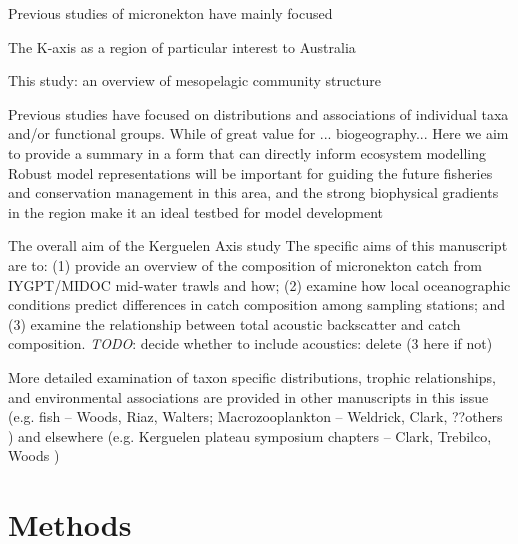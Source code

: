 \documentclass[12pt]{article}
\begin{document}
{Previous studies of micronekton have mainly focused

The 
K-axis as a region of particular interest to Australia

This study: an overview of mesopelagic community structure




Previous studies have focused on distributions and associations of individual taxa and/or functional groups. 
While of great value for ... biogeography... 
Here we aim to provide a summary in a form that can directly inform ecosystem modelling 
Robust model representations will be important for guiding the future fisheries and conservation management in this area, and the strong biophysical gradients in the region make it an ideal testbed for model development

The overall aim of the Kerguelen Axis study
The specific aims of this manuscript are to: 
	(1) provide an overview of the composition of micronekton catch from IYGPT/MIDOC mid-water trawls and how;
	(2) examine how local oceanographic conditions predict differences in catch composition among sampling stations; and
	(3) examine the relationship between total acoustic backscatter and catch composition.
\emph{TODO}: decide whether to include acoustics: delete (3 here if not)


More detailed examination of taxon specific distributions, trophic relationships, and environmental associations are provided in other manuscripts in this issue (e.g.
fish -- Woods, Riaz, Walters;  
Macrozooplankton -- Weldrick, Clark, ??others
)
and elsewhere (e.g.
Kerguelen plateau symposium chapters -- Clark, Trebilco, Woods
)


\section{Methods}



}
\end{document}
